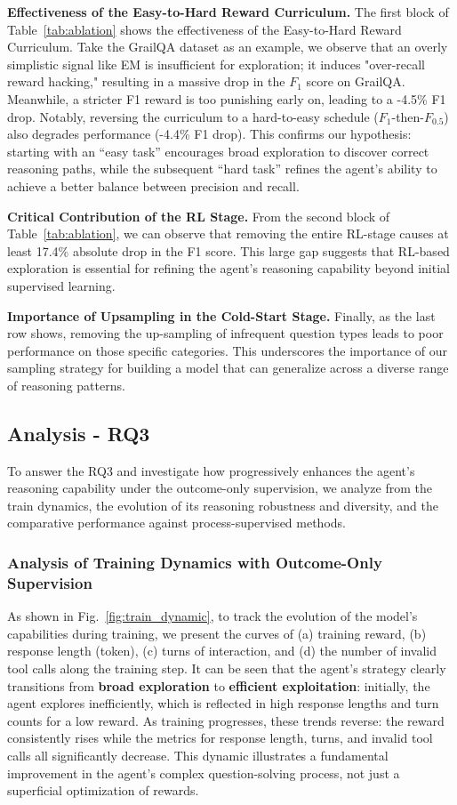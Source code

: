 \textbf{Effectiveness of the Easy-to-Hard Reward Curriculum.}
The first block of Table~\ref{tab:ablation} shows the effectiveness of the Easy-to-Hard Reward Curriculum. Take the GrailQA dataset as an example, we observe that an overly simplistic signal like EM is insufficient for exploration; it induces "over-recall reward hacking," resulting in a massive drop in the $F_1$ score on GrailQA. Meanwhile, a stricter F1 reward is too punishing early on, leading to a -4.5\% F1 drop. Notably, reversing the curriculum to a hard-to-easy schedule ($F_1$-then-$F_{0.5}$) also degrades performance (-4.4\% F1 drop). This confirms our hypothesis: starting with an ``easy task'' encourages broad exploration to discover correct reasoning paths, while the subsequent ``hard task'' refines the agent's ability to achieve a better balance between precision and recall.

\textbf{Critical Contribution of the RL Stage.} From the second block of Table~\ref{tab:ablation}, we can observe that removing the entire RL-stage causes at least 17.4\% absolute drop in the F1 score. This large gap suggests that RL-based exploration is essential for refining the agent's reasoning capability beyond initial supervised learning.

\textbf{Importance of Upsampling in the Cold-Start Stage.}
Finally, as the last row shows, removing the up-sampling of infrequent question types leads to poor performance on those specific categories. This underscores the importance of our sampling strategy for building a model that can generalize across a diverse range of reasoning patterns.

\subsection{Analysis - RQ3}

To answer the RQ3 and investigate how \ours \space progressively enhances the agent's reasoning capability under the outcome-only supervision, we analyze from the train dynamics, the evolution of its reasoning robustness and diversity, and the comparative performance against process-supervised methods. 

\subsubsection{Analysis of Training Dynamics with Outcome-Only Supervision}
\label{sec:trian_dym}
As shown in Fig.~\ref{fig:train_dynamic}, to track the evolution of the model's capabilities during training, we present the curves of (a) training reward, (b) response length (token), (c) turns of interaction, and (d) the number of invalid tool calls along the training step. It can be seen that the agent's strategy clearly transitions from \textbf{broad exploration} to \textbf{efficient exploitation}: initially, the agent explores inefficiently, which is reflected in high response lengths and turn counts for a low reward. As training progresses, these trends reverse: the reward consistently rises while the metrics for response length, turns, and invalid tool calls all significantly decrease. This dynamic illustrates a fundamental improvement in the agent's complex question-solving process, not just a superficial optimization of rewards.

